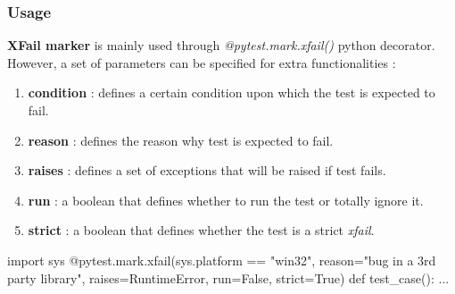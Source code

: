 \subsubsection{Usage}
\textbf{XFail marker} is mainly used through \emph{@pytest.mark.xfail()} python decorator. However, a set of parameters can be specified for extra functionalities :
\begin{enumerate}
    \item \textbf{condition} : defines a certain condition upon which the test is expected to fail.
    \item \textbf{reason} : defines the reason why test is expected to fail.
    \item \textbf{raises} : defines a set of exceptions that will be raised if test fails.
    \item \textbf{run} : a boolean that defines whether to run the test or totally ignore it.
    \item \textbf{strict} : a boolean that defines whether the test is a strict \emph{xfail}.
\end{enumerate}

\begin{python}
import sys
@pytest.mark.xfail(sys.platform == "win32",
reason="bug in a 3rd party library", raises=RuntimeError,
run=False, strict=True)
def test_case():
    ...
\end{python}